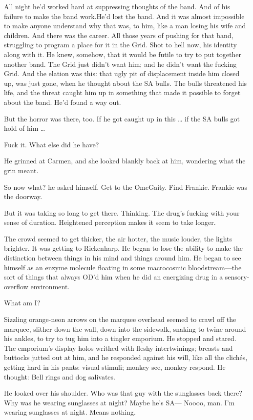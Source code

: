 All night he’d worked hard at suppressing thoughts of the band. And of his failure to make the band work.He’d lost the band. And it was almost impossible to make anyone understand why that was, to him, like a man losing his wife and children. And there was the career. All those years of pushing for that band, struggling to program a place for it in the Grid. Shot to hell now, his identity along with it. He knew, somehow, that it would be futile to try to put together another band. The Grid just didn’t want him; and he didn’t want the fucking Grid. And the elation was this: that ugly pit of displacement inside him closed up, was just gone, when he thought about the SA bulls. The bulls threatened his life, and the threat caught him up in something that made it possible to forget about the band. He’d found a way out.

But the horror was there, too. If he got caught up in this … if the SA bulls got hold of him …

Fuck it. What else did he have?

He grinned at Carmen, and she looked blankly back at him, wondering what the grin meant.

So now what? he asked himself. Get to the OmeGaity. Find Frankie. Frankie was the doorway.

But it was taking so long to get there. Thinking. The drug’s fucking with your sense of duration. Heightened perception makes it seem to take longer.

The crowd seemed to get thicker, the air hotter, the music louder, the lights brighter. It was getting to Rickenharp. He began to lose the ability to make the distinction between things in his mind and things around him. He began to see himself as an enzyme molecule floating in some macrocosmic bloodstream—the sort of things that always OD’d him when he did an energizing drug in a sensory-overflow environment.

What am I?

Sizzling orange-neon arrows on the marquee overhead seemed to crawl off the marquee, slither down the wall, down into the sidewalk, snaking to twine around his ankles, to try to tug him into a tingler emporium. He stopped and stared. The emporium’s display holos writhed with fleshy intertwinings; breasts and buttocks jutted out at him, and he responded against his will, like all the clichés, getting hard in his pants: visual stimuli; monkey see, monkey respond. He thought: Bell rings and dog salivates.

He looked over his shoulder. Who was that guy with the sunglasses back there? Why was he wearing sunglasses at night? Maybe he’s SA— Noooo, man. I’m wearing sunglasses at night. Means nothing.

